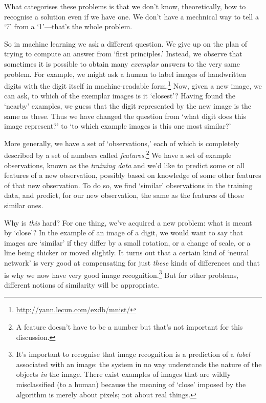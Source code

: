 \documentclass[10pt, a4, twocolumn]{article}
\begin{document}
What categorises these problems is that we don't know, theoretically, how to
recognise a solution even if we have one. We don't have a mechnical way to tell
a `7' from a `1'---that's the whole problem.

So in machine learning we ask a different question. We give up on the plan of
trying to compute an answer from `first principles.' Instead, we observe that
sometimes it is possible to obtain many \emph{exemplar} answers to the very same
problem. For example, we might ask a human to label images of handwritten digits
with the digit itself in machine-readable
form.\footnote{\url{http://yann.lecun.com/exdb/mnist/}} Now, given a new image,
we can ask, to which of the exemplar images is it `closest'? Having found the
`nearby' examples, we guess that the digit represented by the new image is the
same as these. Thus we have changed the question from `what digit does this
image represent?' to `to which example images is this one most similar?'

More generally, we have a set of `observations,' each of which is completely
described by a set of numbers called \emph{features}.\footnote{A feature doesn't
have to be a number but that's not important for this discussion.}  We have a
set of example observations, known as the \emph{training data} and we'd like to
predict some or all features of a new observation, possibly based on knowledge
of some other features of that new observation. To do so, we find `similar'
observations in the training data, and predict, for our new observation, the
same as the features of those similar ones.

Why is \emph{this} hard? For one thing, we've acquired a new problem: what is
meant by `close'? In the example of an image of a digit, we would want to say
that images are `similar' if they differ by a small rotation, or a change of
scale, or a line being thicker or moved slightly. It turns out that a certain
kind of `neural network' is very good at compensating for just \emph{these}
kinds of differences and that is why we now have very good image
recognition.\footnote{It's important to recognise that image recognition is a
prediction of a \emph{label} associated with an image: the system in no way
understands the nature of the objects \emph{in} the image. There exist examples
of images that are wildly misclassified (to a human) because the meaning of
`close' imposed by the algorithm is merely about pixels; not about real things.}
But for other problems, different notions of similarity will be appropriate.
\end{document}

